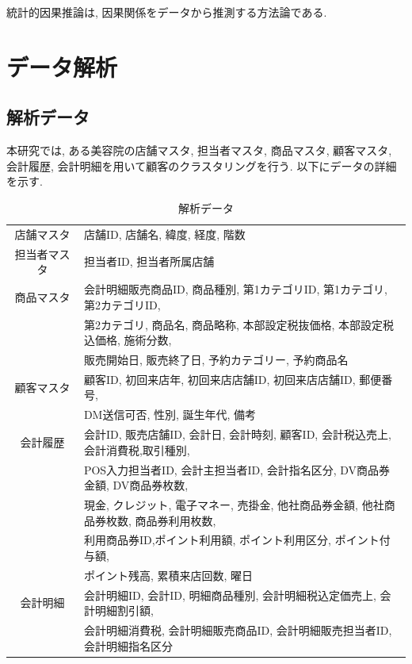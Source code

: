 \documentclass[a4paper]{jarticle}
\begin{document}
統計的因果推論は, 因果関係をデータから推測する方法論である.\citep{清水昌平} 


\section{データ解析}

\subsection{解析データ}

本研究では, ある美容院の店舗マスタ, 担当者マスタ, 商品マスタ, 顧客マスタ, 会計履歴, 会計明細を用いて顧客のクラスタリングを行う. 
以下にデータの詳細を示す. 

\begin{table}[H]
\begin{center}
\caption{解析データ}   %
\label{hairdata}   %
\begin{tabular}{c l}
\hline
店舗マスタ & 店舗ID, 店舗名, 緯度, 経度, 階数 \\

担当者マスタ　& 担当者ID, 担当者所属店舗 \\

商品マスタ & 会計明細販売商品ID, 商品種別,  第1カテゴリID, 第1カテゴリ, 第2カテゴリID, \\
               &  第2カテゴリ, 商品名, 商品略称, 本部設定税抜価格, 本部設定税込価格, 施術分数, \\
               & 販売開始日, 販売終了日, 予約カテゴリー, 予約商品名\\

顧客マスタ & 顧客ID, 初回来店年, 初回来店店舗ID, 初回来店店舗ID, 郵便番号, \\
              & DM送信可否, 性別, 誕生年代, 備考 \\

会計履歴 & 会計ID, 販売店舗ID, 会計日, 会計時刻, 顧客ID, 会計税込売上, 会計消費税,取引種別, \\
             &  POS入力担当者ID, 会計主担当者ID, 会計指名区分, DV商品券金額, DV商品券枚数,\\
             &  現金, クレジット, 電子マネー, 売掛金, 他社商品券金額, 他社商品券枚数, 商品券利用枚数, \\
             &  利用商品券ID,ポイント利用額, ポイント利用区分, ポイント付与額, \\
            &  ポイント残高, 累積来店回数, 曜日\\

会計明細 & 会計明細ID, 会計ID, 明細商品種別, 会計明細税込定価売上, 会計明細割引額, \\
              & 会計明細消費税, 会計明細販売商品ID, 会計明細販売担当者ID, 会計明細指名区分 \\
\hline
\end{tabular}
\end{center}
\end{table}
\end{document}
